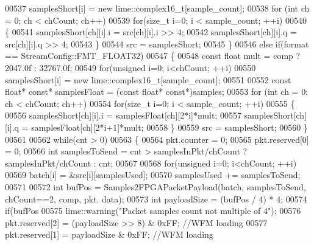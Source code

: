 \begin{DoxyCode}
{{{{{00537             samplesShort[i] = \textcolor{keyword}{new} lime::complex16_t[sample\_count];
00538         \textcolor{keywordflow}{for} (\textcolor{keywordtype}{int} ch = 0; ch < chCount; ch++)
00539             \textcolor{keywordflow}{for}(\textcolor{keywordtype}{size\_t} i=0; i < sample_count; ++i)
00540             \{
00541                 samplesShort[ch][i].i = src[ch][i].i >> 4;
00542                 samplesShort[ch][i].q = src[ch][i].q >> 4;
00543             \}
00544         src = samplesShort;
00545     \}
00546     \textcolor{keywordflow}{else} \textcolor{keywordflow}{if}(format == StreamConfig::FMT\_FLOAT32)
00547     \{
00548         \textcolor{keyword}{const} \textcolor{keywordtype}{float} mult = comp ? 2047.0f : 32767.0f;
00549         \textcolor{keywordflow}{for}(\textcolor{keywordtype}{unsigned} i=0; i<chCount; ++i)
00550             samplesShort[i] = \textcolor{keyword}{new} lime::complex16_t[sample\_count];
00551 
00552         \textcolor{keyword}{const} \textcolor{keywordtype}{float}* \textcolor{keyword}{const}* samplesFloat = (\textcolor{keyword}{const} \textcolor{keywordtype}{float}* \textcolor{keyword}{const}*)samples;
00553         \textcolor{keywordflow}{for} (\textcolor{keywordtype}{int} ch = 0; ch < chCount; ch++)
00554             \textcolor{keywordflow}{for}(\textcolor{keywordtype}{size\_t} i=0; i < sample_count; ++i)
00555             \{
00556                 samplesShort[ch][i].i = samplesFloat[ch][2*i]*mult;
00557                 samplesShort[ch][i].q = samplesFloat[ch][2*i+1]*mult;
00558             \}
00559         src = samplesShort;
00560     \}
00561 
00562     \textcolor{keywordflow}{while}(cnt > 0)
00563     \{
00564         pkt.counter = 0;
00565         pkt.reserved[0] = 0;
00566         \textcolor{keywordtype}{int} samplesToSend = cnt > samplesInPkt/chCount ? samplesInPkt/chCount : cnt;
00567 
00568         \textcolor{keywordflow}{for}(\textcolor{keywordtype}{unsigned} i=0; i<chCount; ++i)
00569             batch[i] = &src[i][samplesUsed];
00570         samplesUsed += samplesToSend;
00571 
00572         \textcolor{keywordtype}{int} bufPos = Samples2FPGAPacketPayload(batch, samplesToSend, chCount==2, comp, pkt.
      data);
00573         \textcolor{keywordtype}{int} payloadSize = (bufPos / 4) * 4;
00574         \textcolor{keywordflow}{if}(bufPos %
00575             lime::warning(\textcolor{stringliteral}{"Packet samples count not multiple of 4"});
00576         pkt.reserved[2] = (payloadSize >> 8) & 0xFF; \textcolor{comment}{//WFM loading}
00577         pkt.reserved[1] = payloadSize & 0xFF; \textcolor{comment}{//WFM loading}
}}}}}
\end{DoxyCode}
